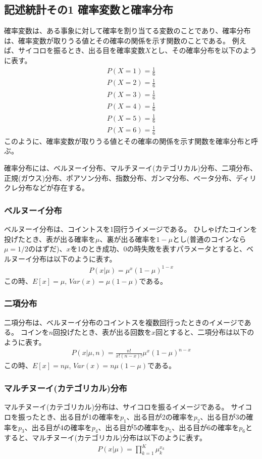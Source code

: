 \documentclass{ltjsarticle}
\begin{document}
\newpage

\subsection{記述統計その1 確率変数と確率分布}
確率変数は、ある事象に対して確率を割り当てる変数のことであり、確率分布は、確率変数が取りうる値とその確率の関係を示す関数のことである。
例えば、サイコロを振るとき、出る目を確率変数$X$とし、その確率分布を以下のように表す。
\begin{align}
P(X=1) = \frac{1}{6}\\
P(X=2) = \frac{1}{6}\\
P(X=3) = \frac{1}{6}\\
P(X=4) = \frac{1}{6}\\
P(X=5) = \frac{1}{6}\\
P(X=6) = \frac{1}{6}
\end{align}
このように、確率変数が取りうる値とその確率の関係を示す関数を確率分布と呼ぶ。
\par
確率分布には、ベルヌーイ分布、マルチヌーイ(カテゴリカル)分布、二項分布、正規(ガウス)分布、ポアソン分布、指数分布、ガンマ分布、ベータ分布、ディリクレ分布などが存在する。
\par
\subsubsection*{ベルヌーイ分布}
ベルヌーイ分布は、コイントスを1回行うイメージである。
ひしゃげたコインを投げたとき、表が出る確率を$\mu$、裏が出る確率を$1-\mu$とし(普通のコインなら$\mu=1/2$のはずだ)、$x$を1のとき成功、0の時失敗を表すパラメータとすると、ベルヌーイ分布は以下のように表す。
\begin{align}
P(x|\mu) = \mu^x(1-\mu)^{1-x}
\end{align}
この時、$E[x] = \mu$, $Var(x) = \mu(1-\mu)$である。
\par
\subsubsection*{二項分布}
二項分布は、ベルヌーイ分布のコイントスを複数回行ったときのイメージである。
コインを$n$回投げたとき、表が出る回数を$x$回とすると、二項分布は以下のように表す。
\begin{align}
P(x|\mu, n) = \frac{n!}{x!(n-x)!} \mu^x(1-\mu)^{n-x}
\end{align}
この時、$E[x] = n\mu$, $Var(x) = n\mu(1-\mu)$である。

\par
\subsubsection*{マルチヌーイ(カテゴリカル)分布}
マルチヌーイ(カテゴリカル)分布は、サイコロを振るイメージである。
サイコロを振ったとき、出る目が1の確率を$p_1$、出る目が2の確率を$p_2$、出る目が3の確率を$p_3$、出る目が4の確率を$p_4$、出る目が5の確率を$p_5$、出る目が6の確率を$p_6$とすると、マルチヌーイ(カテゴリカル)分布は以下のように表す。
\begin{align}
P(x|\mu) = \prod_{k=1}^{K} \mu_k^{x_k}
\end{align}
\end{document}

